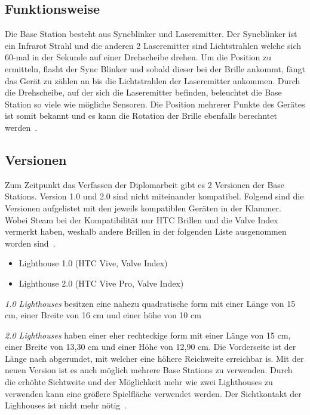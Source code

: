\subsection{Funktionsweise}

Die Base Station besteht aus Syncblinker und Laseremitter.
Der Syncblinker ist ein Infrarot Strahl und die anderen 2 Laseremitter sind Lichtstrahlen welche sich 60-mal in der Sekunde auf einer Drehscheibe drehen.
Um die Position zu ermitteln, flasht der Sync Blinker und sobald dieser bei der Brille ankommt, fängt das Gerät zu zählen an bis die Lichtstrahlen der Laseremitter ankommen.
Durch die Drehscheibe, auf der sich die Laseremitter befinden, beleuchtet die Base Station so viele wie mögliche Sensoren.
Die Position mehrerer Punkte des Gerätes ist somit bekannt und es kann die Rotation der Brille ebenfalls berechntet werden~\cite{Buckley_2015, Skarredghost_2017}.

\subsection{Versionen}

Zum Zeitpunkt das Verfassen der Diplomarbeit gibt es 2 Versionen der Base Stations.
Version 1.0 und 2.0 sind nicht miteinander kompatibel.
Folgend sind die Versionen aufgelistet mit den jeweils kompatiblen Geräten in der Klammer.
Wobei Steam bei der Kompatibilität nur HTC Brillen und die Valve Index vermerkt haben, weshalb andere Brillen in der folgenden Liste ausgenommen worden sind~\cite{steam_lighhouse_versions}.

\begin{itemize}
    \item Lighthouse 1.0 (HTC Vive, Valve Index)
    \item Lighthouse 2.0 (HTC Vive Pro, Valve Index)
\end{itemize}

\emph{1.0 Lighthouses} besitzen eine nahezu quadratische form mit einer Länge von 15 cm, einer Breite von 16 cm und einer höhe von 10 cm

\emph{2.0 Lighthouses} haben einer eher rechteckige form mit einer Länge von 15 cm, einer Breite von 13,30 cm und einer Höhe von 12,90 cm.
Die Vorderseite ist der Länge nach abgerundet, mit welcher eine höhere Reichweite erreichbar is.
Mit der neuen Version ist es auch möglich mehrere Base Stations zu verwenden.
Durch die erhöhte Sichtweite und der Möglichkeit mehr wie zwei Lighthouses zu verwenden kann eine größere Spielfläche verwendet werden.
Der Sichtkontakt der Lighhouses ist nicht mehr nötig~\cite{Cale_2019}.

